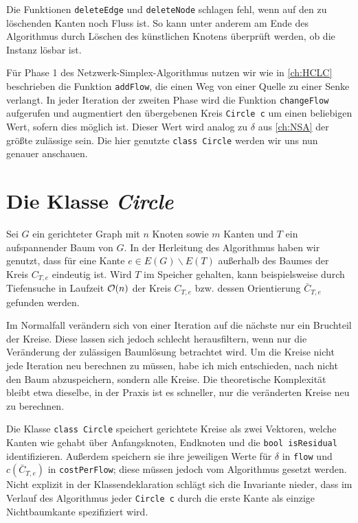 Die Funktionen \lstinline|deleteEdge| und \lstinline|deleteNode| schlagen fehl, wenn auf den zu löschenden Kanten noch Fluss ist. So kann unter anderem am Ende des Algorithmus durch Löschen des künstlichen Knotens überprüft werden, ob die Instanz lösbar ist.

Für Phase 1 des Netzwerk-Simplex-Algorithmus nutzen wir wie in \cref{ch:HCLC} beschrieben die Funktion \lstinline|addFlow|, die einen Weg von einer Quelle zu einer Senke verlangt. In jeder Iteration der zweiten Phase wird die Funktion \lstinline|changeFlow| aufgerufen und augmentiert den übergebenen Kreis \lstinline|Circle c| um einen beliebigen Wert, sofern dies möglich ist. Dieser Wert wird analog zu $\delta$ aus \cref{ch:NSA} der größte zulässige sein. Die hier genutzte \lstinline|class Circle| werden wir uns nun genauer anschauen.

\section{Die Klasse \emph{Circle}}\label{ch:circle}
Sei $G$ ein gerichteter Graph mit $n$ Knoten sowie $m$ Kanten und $T$ ein aufspannender Baum von $G$. In der Herleitung des Algorithmus haben wir genutzt, dass für eine Kante $e\in E(G)\backslash E(T)$ außerhalb des Baumes der Kreis $C_{T,e}$ eindeutig ist. Wird $T$ im Speicher gehalten, kann beispielsweise durch Tiefensuche in Laufzeit $\mathcal{O}(n)$ der Kreis $C_{T,e}$ bzw. dessen Orientierung $\bar{C}_{T,e}$ gefunden werden.

Im Normalfall verändern sich von einer Iteration auf die nächste nur ein Bruchteil der Kreise. Diese lassen sich jedoch schlecht herausfiltern, wenn nur die Veränderung der zulässigen Baumlösung betrachtet wird. Um die Kreise nicht jede Iteration neu berechnen zu müssen, habe ich mich entschieden, nach \cite{betreuer} nicht den Baum abzuspeichern, sondern alle Kreise. Die theoretische Komplexität bleibt etwa dieselbe,\footnotemark{} in der Praxis ist es schneller, nur die veränderten Kreise neu zu berechnen.


Die Klasse \lstinline|class Circle| speichert gerichtete Kreise als zwei Vektoren, welche Kanten wie gehabt über Anfangsknoten, Endknoten und die \lstinline|bool isResidual| identifizieren. Außerdem speichern sie ihre jeweiligen Werte für $\delta$ in \lstinline|flow| und $c(\bar{C}_{T,e})$ in \lstinline|costPerFlow|; diese müssen jedoch vom Algorithmus gesetzt werden. Nicht explizit in der Klassendeklaration schlägt sich die Invariante nieder, dass im Verlauf des Algorithmus jeder \lstinline|Circle c| durch die erste Kante als einzige Nichtbaumkante spezifiziert wird.

